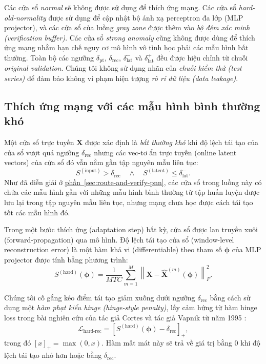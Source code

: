 Các cửa sổ \textit{normal} sẽ không được sử dụng để thích ứng mạng. Các cửa sổ \textit{hard-old-normality} được sử dụng để cập nhật bộ ánh xạ perceptron đa lớp (MLP projector), và các cửa sổ của luồng \textit{gray zone} được thêm vào \textit{bộ đệm xác minh (verification buffer)}. Các cửa sổ \textit{strong anomaly} cũng không được dùng để thích ứng mạng nhằm hạn chế nguy cơ mô hình vô tình học phải các mẫu hình bất thường. Toàn bộ các ngưỡng
\(\delta_{\mathrm{pt}}\), \(\delta_{\mathrm{rec}}\),
\(\delta_{\mathrm{lat}}^{-}\) và
\(\delta_{\mathrm{lat}}^{+}\) đều được hiệu chỉnh từ chuỗi \textit{original validation}. Chúng tôi không sử dụng nhãn của \textit{chuỗi kiểm thử (test series)} để đảm bảo không vi phạm hiện tượng \textit{rò rỉ dữ liệu (data leakage)}.

\subsection{Thích ứng mạng với các mẫu hình bình thường khó}

Một cửa sổ trực tuyến \(\mathbf{X}\) được xác định là \textit{bất thường khó} khi độ lệch tái tạo của cửa sổ vượt quá ngưỡng \(\delta_{\mathrm{rec}}\) nhưng các vec-tơ ẩn trực tuyến (online latent vectors) của cửa sổ đó vẫn nằm gần tập nguyên mẫu liên tục:
\begin{equation}
S^{(\mathrm{input})}>\delta_{\mathrm{rec}}
\quad\land\quad
S^{(\mathrm{latent})}
\leq
\delta_{\mathrm{lat}}^{-}.
\end{equation}
Như đã diễn giải ở \hyperref[sec:route-and-verify-pnn]{phần~\ref*{sec:route-and-verify-pnn}}, các cửa sổ trong luồng này có chứa các mẫu hình gần với những mẫu hình bình thường từ tập huấn luyện được lưu lại trong tập nguyên mẫu liên tục, nhưng mạng chưa học được cách tái tạo tốt các mẫu hình đó.

Trong một bước thích ứng (adaptation step) bất kỳ, cửa sổ được lan truyền xuôi (forward-propagation) qua mô hình. Độ lệch tái tạo cửa sổ (window-level reconstruction error) là một hàm khả vi (differentiable) theo tham số \(\boldsymbol{\phi}\) của MLP projector được
tính bằng phương trình:
\begin{equation}
S^{(\mathrm{hard})}(\boldsymbol{\phi})
=
\frac{1}{MTC}
\sum_{m=1}^{M}
\left\|
\mathbf{X}
-
\widehat{\mathbf{X}}^{(m)}(\boldsymbol{\phi})
\right\|_F^2.
\end{equation}

Chúng tôi cố gắng kéo điểm tái tạo giảm xuống dưới ngưỡng \(\delta_{\mathrm{rec}}\) bằng cách sử
dụng một \textit{hàm phạt kiểu hinge (hinge-style penalty)}, lấy cảm hứng từ hàm hinge loss trong bài nghiên cứu của tác giả Cortes và tác giả Vapnik từ năm 1995 \cite{cortes1995support}:
\begin{equation}
\label{eq:hard-rec-loss}
\mathcal{L}_{\mathrm{hard\text{-}rec}}
=
\left[
S^{(\mathrm{hard})}(\boldsymbol{\phi})
-
\delta_{\mathrm{rec}}
\right]_{+},
\end{equation}
trong đó \([x]_{+}=\max(0,x)\). Hàm mất mát này sẽ trả về giá trị bằng \(0\) khi độ lệch tái tạo nhỏ hơn hoặc bằng \(\delta_{\mathrm{rec}}\).

